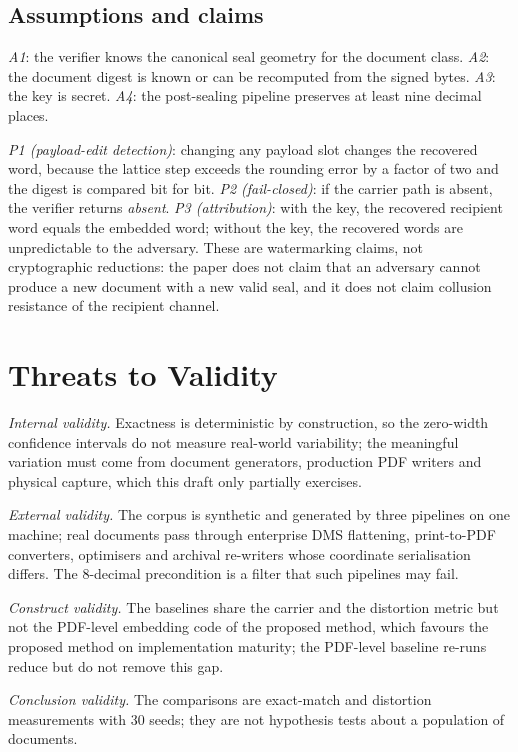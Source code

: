 \documentclass[journal]{IEEEtran}
\begin{document}
\subsection{Assumptions and claims}
\emph{A1}: the verifier knows the canonical seal geometry for the document class. \emph{A2}: the
document digest is known or can be recomputed from the signed bytes. \emph{A3}: the key is secret.
\emph{A4}: the post-sealing pipeline preserves at least nine decimal places.

\emph{P1 (payload-edit detection)}: changing any payload slot changes the recovered word, because
the lattice step exceeds the rounding error by a factor of two and the digest is compared bit for
bit. \emph{P2 (fail-closed)}: if the carrier path is absent, the verifier returns \emph{absent}.
\emph{P3 (attribution)}: with the key, the recovered recipient word equals the embedded word;
without the key, the recovered words are unpredictable to the adversary. These are watermarking
claims, not cryptographic reductions: the paper does not claim that an adversary cannot produce a
new document with a new valid seal, and it does not claim collusion resistance of the recipient
channel.

\section{Threats to Validity}\label{sec:validity}
\emph{Internal validity.} Exactness is deterministic by construction, so the zero-width confidence intervals do not measure real-world variability; the meaningful variation must come from document generators, production PDF writers and physical capture, which this draft only partially exercises.

\emph{External validity.} The corpus is synthetic and generated by three pipelines on one machine; real documents pass through enterprise DMS flattening, print-to-PDF converters, optimisers and archival re-writers whose coordinate serialisation differs. The 8-decimal precondition is a filter that such pipelines may fail.

\emph{Construct validity.} The baselines share the carrier and the distortion metric but not the PDF-level embedding code of the proposed method, which favours the proposed method on implementation maturity; the PDF-level baseline re-runs reduce but do not remove this gap.

\emph{Conclusion validity.} The comparisons are exact-match and distortion measurements with 30 seeds; they are not hypothesis tests about a population of documents.
\end{document}
